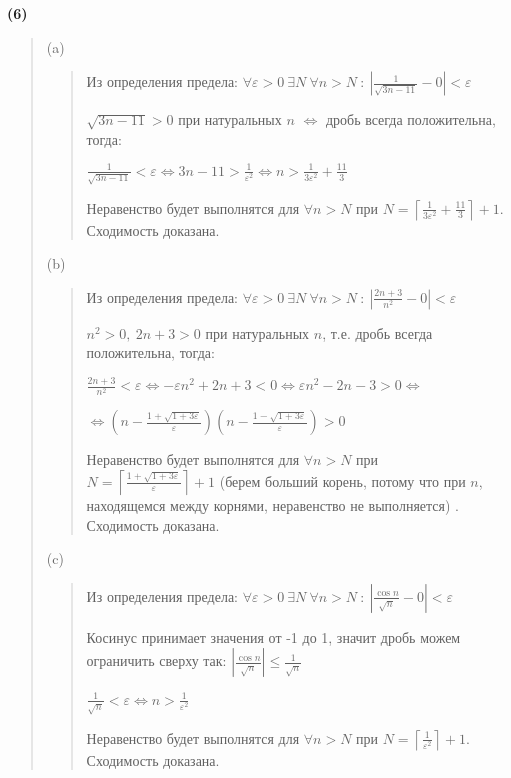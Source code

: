 \documentclass{article}
\begin{document}
\textsf{\textbf{(6)}}
\begin{quote}
(a) 
\begin{quote}
   Из определения предела:
   $\forall \varepsilon > 0 \ \exists N \ \forall n > N \ : \ |\frac{1}{\sqrt{3n - 11}} - 0| < \varepsilon$
   
    $\sqrt{3n - 11} > 0$ при натуральных $n$ $\Leftrightarrow $ дробь всегда положительна, тогда:
    
    $\frac{1}{\sqrt{3n - 11}} < \varepsilon \Longleftrightarrow
    3n - 11 > \frac{1}{\varepsilon ^ 2} \Longleftrightarrow n > \frac{1}{3 \varepsilon ^ 2} + \frac{11}{3}$

    Неравенство будет выполнятся для $\forall n > N$ при $N = \left\lceil{\frac{1}{3 \varepsilon ^ 2} + \frac{11}{3}}\right\rceil + 1$. Сходимость доказана.
\end{quote}

(b) 
\begin{quote}
   Из определения предела:
   $\forall \varepsilon > 0 \ \exists N \ \forall n > N \ : \ |\frac{2n + 3}{n ^ 2} - 0| < \varepsilon$
   
    $n^2 > 0, \ 2n + 3 > 0$ при натуральных $n$, т.е. дробь всегда положительна, тогда:

    $\frac{2n + 3}{n^2} < \varepsilon \Longleftrightarrow - \varepsilon n^2 + 2n + 3 < 0
    \Longleftrightarrow \varepsilon n^2 - 2n - 3 > 0 \Longleftrightarrow $
    
    $\Longleftrightarrow (n - \frac{1 + \sqrt{1 + 3 \varepsilon}}{\varepsilon})(n - \frac{1 - \sqrt{1 + 3 \varepsilon}}{\varepsilon}) > 0
    $

    Неравенство будет выполнятся для $\forall n > N$ при $N = \left\lceil{\frac{1 + \sqrt{1 + 3 \varepsilon}}{\varepsilon}}\right\rceil + 1$ (берем больший корень, потому что при $n$, находящемся между корнями, неравенство не выполняется) . Сходимость доказана.
\end{quote}

(c) 
\begin{quote}
   Из определения предела:
   $\forall \varepsilon > 0 \ \exists N \ \forall n > N \ : \ |\frac{\cos n}{\sqrt{n}} - 0| < \varepsilon$

   
   Косинус принимает значения от -1 до 1, значит дробь можем ограничить сверху так:
   $
    |\frac{\cos n}{\sqrt{n}}| \leq \frac{1}{\sqrt{n}}
   $

  $\frac{1}{\sqrt{n}} < \varepsilon \Longleftrightarrow n > \frac{1}{\varepsilon ^ 2}$ 
  
    Неравенство будет выполнятся для $\forall n > N$ при $N = \left\lceil{\frac{1}{\varepsilon ^ 2}}\right\rceil + 1$. Сходимость доказана.
\end{quote}
   
\end{quote}
\end{document}
